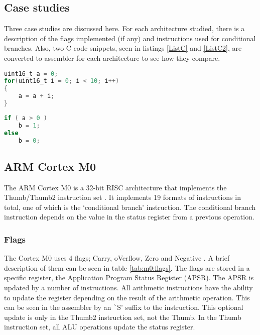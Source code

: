 \documentclass[12pt,a4paper]{article}
\begin{document}
\begin{bibunit}[is-unsrt]
\section{Case studies}

Three case studies are discussed here. 
For each architecture studied, there is a description of the flags implemented (if any) and instructions used for conditional branches. 
Also, two C code snippets, seen in listings \ref{ListC} and \ref{ListC2}, are converted to assembler for each architecture to see how they compare.
%  
\begin{lstlisting}[frame=single,caption=C Code,language=C,label=ListC]
uint16_t a = 0;
for(uint16_t i = 0; i < 10; i++)
{
	a = a + i;
}
\end{lstlisting}
\begin{lstlisting}[frame=single,caption=C Code,language=C,label=ListC2]
if ( a > 0 )
	b = 1;
else
	b = 0;
\end{lstlisting}
%  
\subsection{ARM Cortex M0}

The ARM Cortex M0 is a 32-bit RISC architecture that implements the Thumb/Thumb2 instruction set \cite{ARM:CortexM0}. 
It implements 19 formats of instructions in total, one of which is the `conditional branch' instruction. 
The conditional branch instruction depends on the value in the status register from a previous operation.

\subsubsection{Flags}
The Cortex M0 uses 4 flags; Carry, oVerflow, Zero and Negative \cite{ARM:Flags}.
A brief description of them can be seen in table \ref{tab:m0:flags}.
The flags are stored in a specific register, the Application Program Status Register (APSR). 
The APSR is updated by a number of instructions. 
All arithmetic instructions have the ability to update the register depending on the result of the arithmetic operation. 
This can be seen in the assembler by an {\texttt `S'} suffix to the instruction.
This optional update is only in the Thumb2 instruction set, not the Thumb.
In the Thumb instruction set, all ALU operations update the status register.


\end{bibunit}
\end{document}
